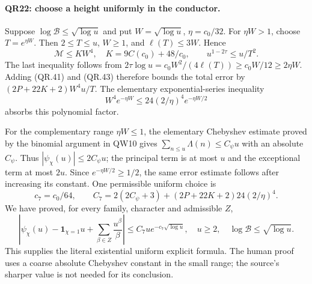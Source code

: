 \paragraph{QR22: choose a height uniformly in the conductor.}
Suppose $\log\mathcal B\le\sqrt{\log u}$ and put
$W=\sqrt{\log u}$, $\eta=c_0/32$. For $\eta W>1$, choose
$T=e^{\eta W}$. Then $2\le T\le u$, $W\ge1$, and
$\ell(T)\le3W$. Hence
\[
 \mathcal M\le K W^4,\quad K=9C(c_0)+48/c_0,
       \qquad u^{1-2\tau}\le u/T^2.                      \tag{QR.44}
\]
The last inequality follows from
$2\tau\log u=c_0W^2/(4\ell(T))\ge c_0W/12
\ge2\eta W$.
Adding (QR.41) and (QR.43) therefore bounds the total error by
$(2P+22K+2)W^4u/T$. The elementary exponential-series inequality
\[
 W^4e^{-\eta W}\le24(2/\eta)^4e^{-\eta W/2}
\]
absorbs this polynomial factor.

For the complementary range $\eta W\le1$, the elementary
Chebyshev estimate proved by the binomial argument in QW10 gives
$\sum_{n\le u}\Lambda(n)\le C_\psi u$ with an absolute
$C_\psi$. Thus $|\psi_\chi(u)|\le2C_\psi u$; the principal
term is at most $u$ and the exceptional term at most $2u$.
Since $e^{-\eta W/2}\ge1/2$, the same error estimate follows
after increasing its constant. One permissible uniform choice is
\[
 c_7=c_0/64,\qquad
 C_7=2(2C_\psi+3)+(2P+22K+2)24(2/\eta)^4.
\]
We have proved, for every family, character and admissible $Z$,
\[
 \left|\psi_\chi(u)-\mathbf1_{\chi=1}u
                         +\sum_{\beta\in Z}\frac{u^\beta}{\beta}\right|
       \le C_7u e^{-c_7\sqrt{\log u}},
       \quad u\ge2,\quad\log\mathcal B\le\sqrt{\log u}.  \tag{QR.45}
\]
This supplies the literal existential uniform explicit formula. The
human proof uses a coarse absolute Chebyshev constant in the small
range; the source's sharper value is not needed for its conclusion.

